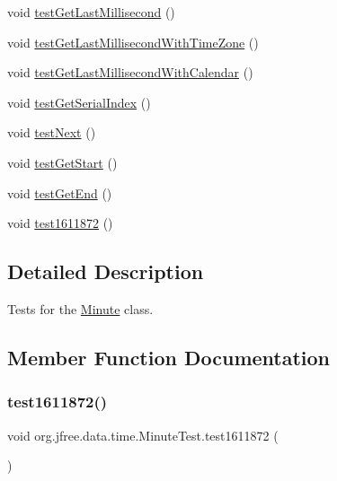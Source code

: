 \begin{DoxyCompactItemize}
void \mbox{\hyperlink{classorg_1_1jfree_1_1data_1_1time_1_1_minute_test_ac78b7028e336dc77a02d5509573c9d15}{test\+Get\+Last\+Millisecond}} ()
\item 
void \mbox{\hyperlink{classorg_1_1jfree_1_1data_1_1time_1_1_minute_test_a7e04819200aee45a08f22a92cec16e85}{test\+Get\+Last\+Millisecond\+With\+Time\+Zone}} ()
\item 
void \mbox{\hyperlink{classorg_1_1jfree_1_1data_1_1time_1_1_minute_test_a884663521b17985e50d470d944877e4c}{test\+Get\+Last\+Millisecond\+With\+Calendar}} ()
\item 
void \mbox{\hyperlink{classorg_1_1jfree_1_1data_1_1time_1_1_minute_test_a0f45aeab87d47fd6ab8c454c89a6ce6f}{test\+Get\+Serial\+Index}} ()
\item 
void \mbox{\hyperlink{classorg_1_1jfree_1_1data_1_1time_1_1_minute_test_ab4429d99caf3198852e50365b41672be}{test\+Next}} ()
\item 
void \mbox{\hyperlink{classorg_1_1jfree_1_1data_1_1time_1_1_minute_test_acdbf459e2fad11ca0cc0a5dda7e54697}{test\+Get\+Start}} ()
\item 
void \mbox{\hyperlink{classorg_1_1jfree_1_1data_1_1time_1_1_minute_test_abf85f1da7ec0efe2bf0a74d0047a36ed}{test\+Get\+End}} ()
\item 
void \mbox{\hyperlink{classorg_1_1jfree_1_1data_1_1time_1_1_minute_test_a9a1c6527114697a0f9e35c7122a96263}{test1611872}} ()
\end{DoxyCompactItemize}


\subsection{Detailed Description}
Tests for the \mbox{\hyperlink{classorg_1_1jfree_1_1data_1_1time_1_1_minute}{Minute}} class. 

\subsection{Member Function Documentation}
\mbox{\label{classorg_1_1jfree_1_1data_1_1time_1_1_minute_test_a9a1c6527114697a0f9e35c7122a96263}} 
\subsubsection{\texorpdfstring{test1611872()}{test1611872()}}
{\footnotesize\ttfamily void org.\+jfree.\+data.\+time.\+Minute\+Test.\+test1611872 (\begin{DoxyParamCaption}{ }\end{DoxyParamCaption})}

